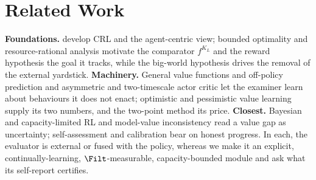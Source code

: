 
\section{Related Work}
\label{sec:related}

\textbf{Foundations.} \citet{ring1994continual,abel2023definition,abel2024dogmas,abel2020bounded} develop CRL and the agent-centric view; bounded optimality and resource-rational analysis \citep{simon1955behavioral,russell1995bounded,lewis2014computational,lieder2020resource} motivate the comparator $f^{K_L}$ and the reward hypothesis \citep{silver2021reward} the goal it tracks, while the big-world hypothesis \citep{javed2025bigworld,lewandowski2025bigger,dohare2024plasticity} drives the removal of the external yardstick. \textbf{Machinery.} General value functions and off-policy prediction \citep{sutton2011horde,modayil2014nexting,suttonprecupsingh1999,precup2001offpolicy} and asymmetric and two-timescale actor critic \citep{pinto2018asymmetric,konda2000actorcritic,borkar1997twotimescale} let the examiner learn about behaviours it does not enact; optimistic and pessimistic value learning \citep{kearns2002e3,brafman2002rmax,jaksch2010ucrl2,auer2002ucb,strehl2009pacmdp,azar2017minimax,kakade2002cpi,kumar2020cql,jin2021pessimism,osband2016bootstrapped} supply its two numbers, and the two-point method \citep{lai1985asymptotically,tsybakov2009} its price. \textbf{Closest.} Bayesian and capacity-limited RL \citep{osband2013psrl,russo2017ids,lu2021bitbybit,arumugam2024capacity} and model-value inconsistency \citep{filos2022modelvalue} read a value gap as uncertainty; self-assessment and calibration \citep{schmidhuber2010formal,oudeyer2007intrinsic,bellemare2016count,pathak2017curiosity,burda2019rnd,foster1998calibration,li2011kwik,morrill2021hindsight} bear on honest progress. In each, the evaluator is external or fused with the policy, whereas we make it an explicit, continually-learning, $\Filt$-measurable, capacity-bounded module and ask what its self-report certifies.
